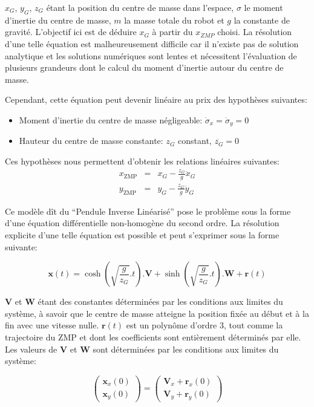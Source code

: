 $x_G$, $y_G$, $z_G$ étant la position du centre de masse dans
l'espace, $\sigma$ le moment d'inertie du centre de masse, $m$ la
masse totale du robot et $g$ la constante de gravité. L'objectif ici
est de déduire $x_{G}$ à partir du $x_{ZMP}$ choisi. La résolution
d'une telle équation est malheureusement difficile car il n'existe pas
de solution analytique et les solutions numériques sont lentes et
nécessitent l'évaluation de plusieurs grandeurs dont le calcul du
moment d'inertie autour du centre de masse.

Cependant, cette équation peut devenir linéaire au prix des hypothèses suivantes:
\begin{itemize}
\item Moment d'inertie du centre de masse négligeable: $\dot{\sigma}_x = \dot{\sigma}_y = 0$
\item Hauteur du centre de masse constante: $z_G$ constant, $\ddot{z_G} = 0$
\end{itemize}

Ces hypothèses nous permettent d'obtenir les relations linéaires suivantes:
\begin{eqnarray*}
x_{\text{ZMP}} &=& x_G - \frac{z_G}{g} \ddot{x}_G\\
y_{\text{ZMP}} &=& y_G - \frac{z_G}{g} \ddot{y}_G
\end{eqnarray*}

Ce modèle dît du ``Pendule Inverse Linéarisé'' pose le problème sous
la forme d'une équation différentielle non-homogène du second
ordre. La résolution explicite d'une telle équation est possible et
peut s'exprimer sous la forme suivante:

\begin{equation}
  \mathbf{x}(t) = \cosh(\sqrt{\frac{g}{z_G}}.t) . \mathbf{V} + \sinh(\sqrt{\frac{g}{z_G}}.t) . \mathbf{W} + \mathbf{r}(t)
\end{equation}

$\mathbf{V}$ et $\mathbf{W}$ étant des constantes déterminées par les
conditions aux limites du système, à savoir que le centre de masse
atteigne la position fixée au début et à la fin avec une vitesse
nulle. $\textbf{r}(t)$ est un polynôme d'ordre 3, tout comme la
trajectoire du ZMP et dont les coefficients sont entièrement
déterminés par elle. Les valeurs de $\mathbf{V}$ et $\mathbf{W}$ sont
déterminées par les conditions aux limites du système:

\begin{equation}
  \left(
  \begin{array}{c}
    \mathbf{x}_x(0)\\
    \mathbf{x}_y(0)
  \end{array}
  \right) = \left(
  \begin{array}{c}
    \mathbf{V}_x + \mathbf{r}_x(0)\\
    \mathbf{V}_y + \mathbf{r}_y(0)
  \end{array}
  \right)
\end{equation}

